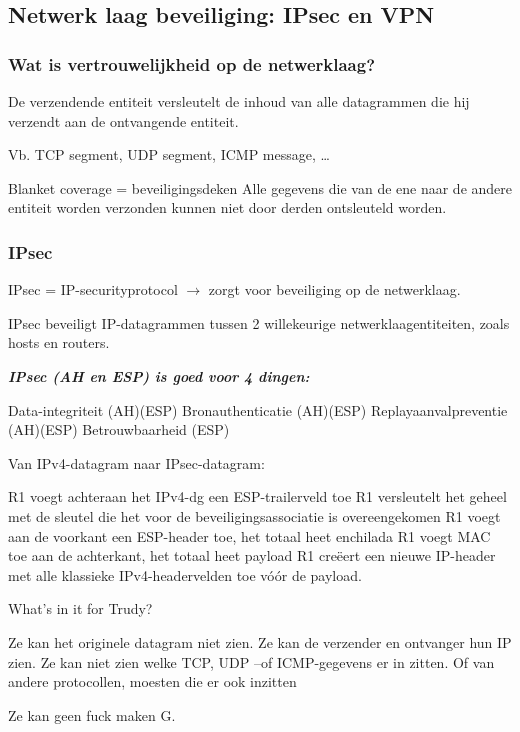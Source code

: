 \subsection{Netwerk laag beveiliging: IPsec en VPN}

\subsubsection{Wat is vertrouwelijkheid op de netwerklaag?}

\be
\itf De verzendende entiteit versleutelt de inhoud van alle datagrammen die hij verzendt aan de ontvangende entiteit.

\be
\itf Vb. TCP segment, UDP segment, ICMP message, …
\ee

\itf Blanket coverage = beveiligingsdeken
\be
\itf Alle gegevens die van de ene naar de andere entiteit worden verzonden kunnen niet door derden ontsleuteld worden.
\ee

\ee

\subsubsection{IPsec}

\noindent IPsec = IP-securityprotocol $\rightarrow$ zorgt voor beveiliging op de netwerklaag.

\noindent IPsec beveiligt IP-datagrammen tussen 2 willekeurige netwerklaagentiteiten, zoals hosts en routers.

\noindent \textit{\textbf{IPsec (AH en ESP) is goed voor 4 dingen:}}

\be
\itf Data-integriteit (AH)(ESP)
\itf Bronauthenticatie (AH)(ESP)
\itf Replayaanvalpreventie (AH)(ESP)
\itf Betrouwbaarheid (ESP)
\ee

\newpage

\noindent Van IPv4-datagram naar IPsec-datagram:

\be
\itf R1 voegt achteraan het IPv4-dg een ESP-trailerveld toe
\itf R1 versleutelt het geheel met de sleutel die het voor de beveiligingsassociatie is overeengekomen
\itf R1 voegt aan de voorkant een ESP-header toe, het totaal heet enchilada
\itf R1 voegt MAC toe aan de achterkant, het totaal heet payload
\itf R1 creëert een nieuwe IP-header met alle klassieke IPv4-headervelden toe vóór de payload.
\ee

\noindent What’s in it for Trudy?

\bi
\itf Ze kan het originele datagram niet zien.
\itf Ze kan de verzender en ontvanger hun IP zien.
\itf Ze kan niet zien welke TCP, UDP –of ICMP-gegevens er in zitten. Of van andere protocollen, moesten die er ook inzitten
\item Ze kan geen fuck maken G.
\ei

